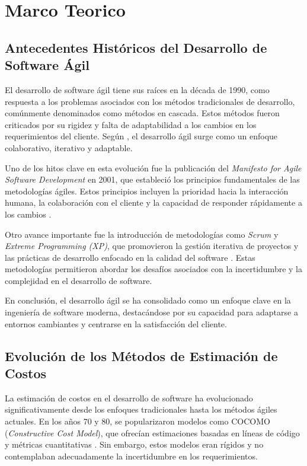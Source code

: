 \chapter{Marco Teorico}
\section{Antecedentes Históricos del Desarrollo de Software Ágil}
El desarrollo de software ágil tiene sus raíces en la década de 1990, como respuesta a los problemas asociados con los métodos tradicionales de desarrollo, comúnmente denominados como métodos en cascada. Estos métodos fueron criticados por su rigidez y falta de adaptabilidad a los cambios en los requerimientos del cliente. Según \textcite{beck2001manifesto}, el desarrollo ágil surge como un enfoque colaborativo, iterativo y adaptable.

Uno de los hitos clave en esta evolución fue la publicación del \textit{Manifesto for Agile Software Development} en 2001, que estableció los principios fundamentales de las metodologías ágiles. Estos principios incluyen la prioridad hacia la interacción humana, la colaboración con el cliente y la capacidad de responder rápidamente a los cambios \parencite{fowler2001agile}.

Otro avance importante fue la introducción de metodologías como \textit{Scrum} y \textit{Extreme Programming (XP)}, que promovieron la gestión iterativa de proyectos y las prácticas de desarrollo enfocado en la calidad del software \parencite{schwaber1997scrum}. Estas metodologías permitieron abordar los desafíos asociados con la incertidumbre y la complejidad en el desarrollo de software.

En conclusión, el desarrollo ágil se ha consolidado como un enfoque clave en la ingeniería de software moderna, destacándose por su capacidad para adaptarse a entornos cambiantes y centrarse en la satisfacción del cliente.

\section{Evolución de los Métodos de Estimación de Costos}
La estimación de costos en el desarrollo de software ha evolucionado significativamente desde los enfoques tradicionales hasta los métodos ágiles actuales. En los años 70 y 80, se popularizaron modelos como COCOMO (\textit{Constructive Cost Model}), que ofrecían estimaciones basadas en líneas de código y métricas cuantitativas \parencite{boehm1981cocomo}. Sin embargo, estos modelos eran rígidos y no contemplaban adecuadamente la incertidumbre en los requerimientos.

